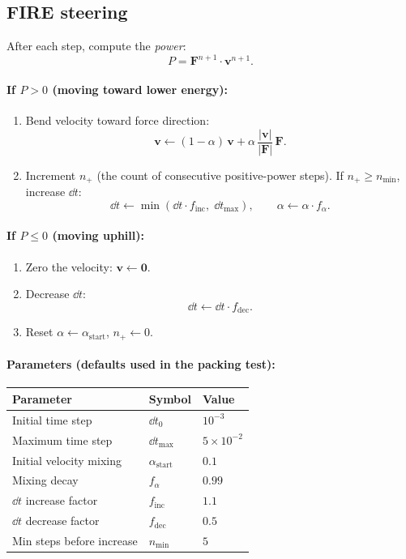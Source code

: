 \documentclass[12pt]{article}
\begin{document}
\subsection{FIRE steering}

After each step, compute the \emph{power}:
\[
  P = \mathbf{F}^{n+1} \cdot \mathbf{v}^{n+1}.
\]

\paragraph{If $P > 0$ (moving toward lower energy):}
\begin{enumerate}
  \item Bend velocity toward force direction:
  \[
    \mathbf{v} \leftarrow (1-\alpha)\,\mathbf{v}
               + \alpha\,\frac{|\mathbf{v}|}{|\mathbf{F}|}\,\mathbf{F}.
  \]
  \item Increment $n_+$ (the count of consecutive positive-power steps).
  If $n_+ \geq n_{\min}$, increase $\dd t$:
  \[
    \dd t \leftarrow \min(\dd t \cdot f_{\mathrm{inc}},\; \dd t_{\max}),
    \qquad \alpha \leftarrow \alpha \cdot f_\alpha.
  \]
\end{enumerate}

\paragraph{If $P \leq 0$ (moving uphill):}
\begin{enumerate}
  \item Zero the velocity: $\mathbf{v} \leftarrow \mathbf{0}$.
  \item Decrease $\dd t$:
  \[
    \dd t \leftarrow \dd t \cdot f_{\mathrm{dec}}.
  \]
  \item Reset $\alpha \leftarrow \alpha_{\mathrm{start}}$, $n_+ \leftarrow 0$.
\end{enumerate}

\paragraph{Parameters (defaults used in the packing test):}
\begin{center}
\begin{tabular}{lll}
  Parameter & Symbol & Value \\
  \hline
  Initial time step & $\dd t_0$ & $10^{-3}$ \\
  Maximum time step & $\dd t_{\max}$ & $5\times10^{-2}$ \\
  Initial velocity mixing & $\alpha_{\mathrm{start}}$ & $0.1$ \\
  Mixing decay & $f_\alpha$ & $0.99$ \\
  $\dd t$ increase factor & $f_{\mathrm{inc}}$ & $1.1$ \\
  $\dd t$ decrease factor & $f_{\mathrm{dec}}$ & $0.5$ \\
  Min steps before increase & $n_{\min}$ & $5$ \\
\end{tabular}
\end{center}
\end{document}

